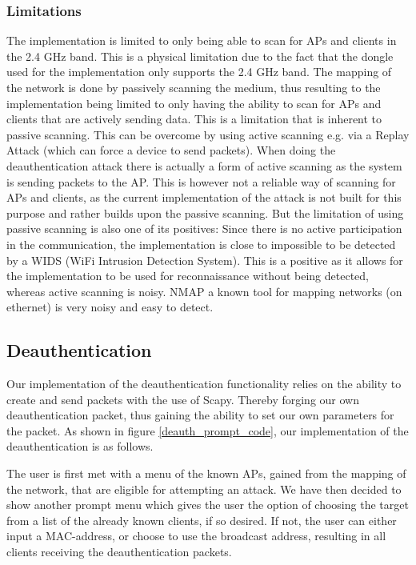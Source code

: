 \subsubsection{Limitations}
The implementation is limited to only being able to scan for APs and clients in the 2.4 GHz band. This is a physical limitation due to the fact that the dongle used for the implementation only supports the 2.4 GHz band.
The mapping of the network is done by passively scanning the medium, thus resulting to the implementation being limited to only having the ability to scan for APs and clients that are actively sending data. This is a limitation that is inherent to passive scanning. This can be overcome by using active scanning e.g. via a Replay Attack (which can force a device to send packets).
When doing the deauthentication attack there is actually a form of active scanning as the system is sending packets to the AP. This is however not a reliable way of scanning for APs and clients, as the current implementation of the attack is not built for this purpose and rather builds upon the passive scanning.
But the limitation of using passive scanning is also one of its positives: Since there is no active participation in the communication, the implementation is close to impossible to be detected by a WIDS (WiFi Intrusion Detection System). This is a positive as it allows for the implementation to be used for reconnaissance without being detected, whereas active scanning is noisy. NMAP a known tool for mapping networks (on ethernet) is very noisy and easy to detect.


\subsection{Deauthentication}
Our implementation of the deauthentication functionality relies on the ability to create and send packets with the use of Scapy. Thereby forging our own deauthentication packet, thus gaining the ability to set our own parameters for the packet.
As shown in figure \ref{deauth_prompt_code}, our implementation of the deauthentication is as follows. 

The user is first met with a menu of the known APs, gained from the mapping of the network, that are eligible for attempting an attack.
We have then decided to show another prompt menu which gives the user the option of choosing the target from a list of the already known clients, if so desired. If not, the user can either input a MAC-address, or choose to use the broadcast address, resulting in all clients receiving the deauthentication packets. 

